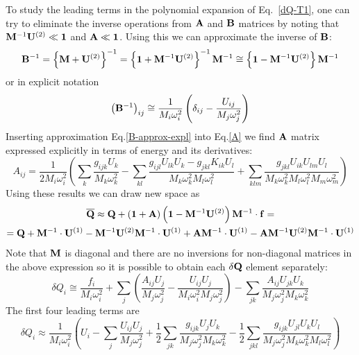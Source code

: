 \documentclass[a4paper,titlepage,twoside,fleqn,12pt]{book}
\begin{document}
\begin{refsection}
To study the leading terms in the polynomial expansion of Eq.~\eqref{dQ-T1}, 
one can try to eliminate the inverse operations from ${\bf A}$ and ${\bf B}$ matrices by noting that
${\bf M}^{-1} {\bf U}^{(2)} \ll {\bf 1}$ and ${\bf A} \ll {\bf 1}$. 
Using this we can approximate the inverse of ${\bf B}$:
%
\begin{equation}\label{B-approx}
{\bf B}^{-1} = \left\{ {\bf M} + {\bf U}^{(2)} \right\}^{-1} 
= \left\{ {\bf 1} + {\bf M}^{-1}{\bf U}^{(2)} \right\}^{-1}{\bf M}^{-1}
\cong \left\{ {\bf 1} - {\bf M}^{-1}{\bf U}^{(2)} \right\}{\bf M}^{-1}
\end{equation}
%
or in explicit notation
%
\begin{equation}\label{B-approx-expl}
\left( {\bf B}^{-1} \right)_{ij} \cong
\frac{1}{M_i\omega_i^2} \left( \delta_{ij} - \frac{U_{ij}}{M_j\omega_j^2} \right)
\end{equation}
%
Inserting approximation Eq.\eqref{B-approx-expl} into Eq.\eqref{A} we find
${\bf A}$ matrix expressed explicitly in terms of energy and its derivatives:
%
\begin{equation}\label{A-approx-expl}
A_{ij} = \frac{1}{2M_i\omega_i^2} 
\left(
     \sum_k \frac{g_{ijk}U_k}{M_k\omega_k^2} -
     \sum_{kl} \frac{ g_{ijl} U_{lk} U_k - g_{jkl} K_{ik} U_l }
                    {M_k\omega_k^2 M_l\omega_l^2} +
     \sum_{klm} \frac{ g_{jkl} U_{ik} U_{lm} U_l }
                     {M_k\omega_k^2 M_l\omega_l^2 M_m\omega_m^2}
\right)
\end{equation}
%
Using these results we can draw new space as
\begin{multline}\label{Q-new-T2-approx}
{\bf \overline{Q}} \approx {\bf Q} + \left( {\bf 1} + {\bf A} \right) \left( {\bf 1} - {\bf M}^{-1}{\bf U}^{(2)} \right){\bf M}^{-1} \cdot {\bf f}
= \\
={\bf Q} + {\bf M}^{-1} \cdot {\bf U}^{(1)} - {\bf M}^{-1}{\bf U}^{(2)}{\bf M}^{-1}\cdot{\bf U}^{(1)}
+ {\bf A}{\bf M}^{-1}\cdot{\bf U}^{(1)} - {\bf A}{\bf M}^{-1}{\bf U}^{(2)}{\bf M}^{-1}\cdot{\bf U}^{(1)}
\end{multline}
%
Note that ${\bf M}$ is diagonal and there are no inversions 
for non-diagonal matrices in the above expression
so it is possible to obtain each $\delta{\bf Q}$
element separately:
%
\begin{equation}\label{dQ-approx-T1-expl}
\delta Q_i \cong \frac{f_i}{M_i\omega_i^2} + 
  \sum_j \left( 
         \frac{ A_{ij}U_j }{M_j\omega_j^2} - 
         \frac{ U_{ij}U_j }{M_i\omega_i^2 M_j\omega_j^2}
         \right) -
  \sum_{jk} \frac{ A_{ij} U_{jk} U_k }{M_j\omega_j^2 M_k\omega_k^2}
\end{equation}
%
The first four leading terms are
%
\begin{equation}\label{dQ-approx-T1-expl-lead}
\delta Q_i \approx 
\frac{1}{M_i\omega_i^2}
\left(
    U_i - \sum_j \frac{U_{ij}U_j}{M_j\omega_j^2} + 
    \frac{1}{2} \sum_{jk} \frac{g_{ijk}U_jU_k}{M_j\omega_j^2 M_k\omega_k^2} -
    \frac{1}{2} \sum_{jkl} \frac{g_{ijk}U_{jl}U_kU_l}{M_j\omega_j^2 M_k\omega_k^2 M_l\omega_l^2}
\right)
\end{equation}
%


\end{refsection}
\end{document}
